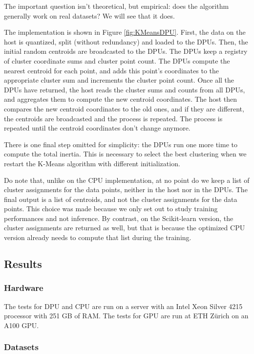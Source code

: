 The important question isn't theoretical, but empirical: does the algorithm generally work on real datasets? We will see that it does.

\bigskip

The implementation is shown in Figure \ref{fig:KMeansDPU}. First, the data on the host is quantized, split (without redundancy) and loaded to the DPUs. Then, the initial random centroids are broadcasted to the DPUs. The DPUs keep a registry of cluster coordinate sums and cluster point count. The DPUs compute the nearest centroid for each point, and adds this point's coordinates to the appropriate cluster sum and increments the cluster point count. Once all the DPUs have returned, the host reads the cluster sums and counts from all DPUs, and aggregates them to compute the new centroid coordinates. The host then compares the new centroid coordinates to the old ones, and if they are different, the centroids are broadcasted and the process is repeated. The process is repeated until the centroid coordinates don't change anymore.

There is one final step omitted for simplicity: the DPUs run one more time to compute the total inertia. This is necessary to select the best clustering when we restart the K-Means algorithm with different initialization.

Do note that, unlike on the CPU implementation, at no point do we keep a list of cluster assignments for the data points, neither in the host nor in the DPUs. The final output is a list of centroids, and not the cluster assignments for the data points. This choice was made because we only set out to study training performances and not inference. By contrast, on the Scikit-learn version, the cluster assignments are returned as well, but that is because the optimized CPU version already needs to compute that list during the training.

\subsection{Results}

\subsubsection{Hardware}

The tests for DPU and CPU are run on a server with an Intel Xeon Silver 4215 processor with 251 GB of RAM. The tests for GPU are run at ETH Zürich on an A100 GPU.

\subsubsection{Datasets}

